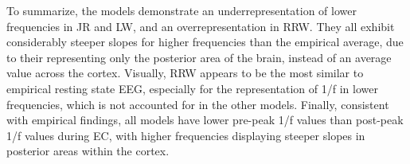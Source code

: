 \documentclass[12pt,twoside]{article}
\begin{document}
To summarize, the models demonstrate an underrepresentation of lower frequencies in JR and LW, and an overrepresentation in RRW. They all exhibit considerably steeper slopes for higher frequencies than the empirical average, due to their representing only the posterior area of the brain, instead of an average value across the cortex. Visually, RRW appears to be the most similar to empirical resting state EEG, especially for the representation of 1/f in lower frequencies, which is not accounted for in the other models. Finally, consistent with empirical findings, all models have lower pre-peak 1/f values than post-peak 1/f values during EC, with higher frequencies displaying steeper slopes in posterior areas within the cortex.  %

\end{document}
